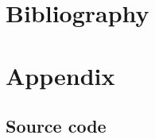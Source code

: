 \documentclass[10pt,a4paper,twocolumn]{article}
\begin{document}
\section*{Bibliography}

\renewcommand\refname{}
\vspace*{-24pt}
\makeatother

\section*{Appendix}

\subsection*{Source code}
\onecolumn
\end{document}

